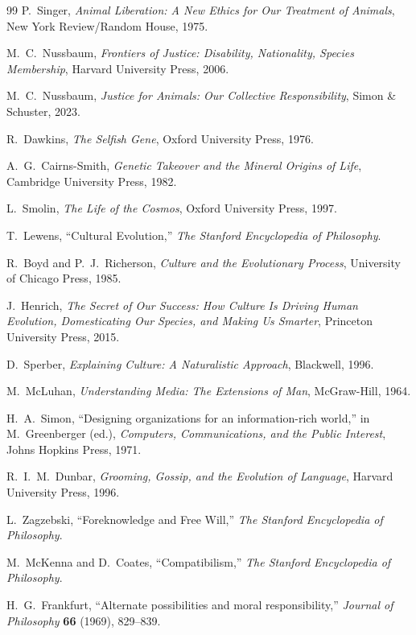 \documentclass[11pt]{article}
\theoremstyle{remark}
\theoremstyle{plain}
\begin{document}
\begin{thebibliography}{99}
P.\ Singer,
\emph{Animal Liberation: A New Ethics for Our Treatment of Animals},
New York Review/Random House, 1975.

M.\ C.\ Nussbaum,
\emph{Frontiers of Justice: Disability, Nationality, Species Membership},
Harvard University Press, 2006.

M.\ C.\ Nussbaum,
\emph{Justice for Animals: Our Collective Responsibility},
Simon \& Schuster, 2023.

R.\ Dawkins,
\emph{The Selfish Gene},
Oxford University Press, 1976.

A.\ G.\ Cairns-Smith,
\emph{Genetic Takeover and the Mineral Origins of Life},
Cambridge University Press, 1982.

L.\ Smolin,
\emph{The Life of the Cosmos},
Oxford University Press, 1997.

T.\ Lewens,
``Cultural Evolution,''
\emph{The Stanford Encyclopedia of Philosophy}.

R.\ Boyd and P.\ J.\ Richerson,
\emph{Culture and the Evolutionary Process},
University of Chicago Press, 1985.

J.\ Henrich,
\emph{The Secret of Our Success: How Culture Is Driving Human Evolution, Domesticating Our Species, and Making Us Smarter},
Princeton University Press, 2015.

D.\ Sperber,
\emph{Explaining Culture: A Naturalistic Approach},
Blackwell, 1996.

M.\ McLuhan,
\emph{Understanding Media: The Extensions of Man},
McGraw-Hill, 1964.

H.\ A.\ Simon,
``Designing organizations for an information-rich world,''
in M.\ Greenberger (ed.),
\emph{Computers, Communications, and the Public Interest},
Johns Hopkins Press, 1971.

R.\ I.\ M.\ Dunbar,
\emph{Grooming, Gossip, and the Evolution of Language},
Harvard University Press, 1996.

L.\ Zagzebski,
``Foreknowledge and Free Will,''
\emph{The Stanford Encyclopedia of Philosophy}.

M.\ McKenna and D.\ Coates,
``Compatibilism,''
\emph{The Stanford Encyclopedia of Philosophy}.

H.\ G.\ Frankfurt,
``Alternate possibilities and moral responsibility,''
\emph{Journal of Philosophy} \textbf{66} (1969), 829--839.


\end{thebibliography}
\end{document}
